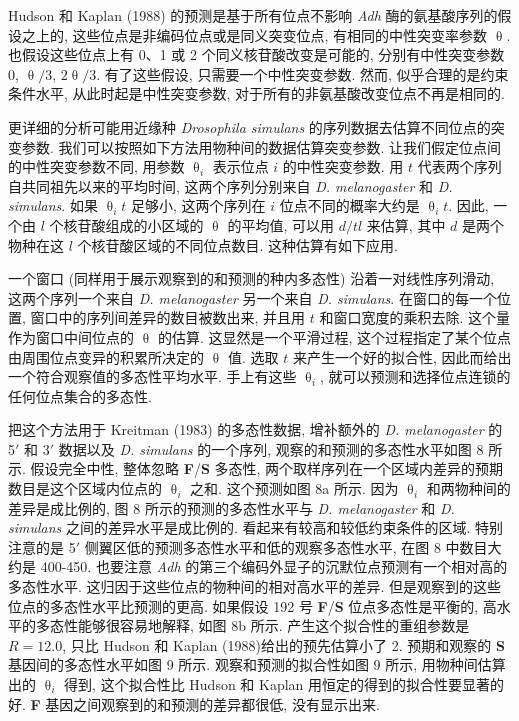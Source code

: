 \documentclass[12pt]{article}
\begin{document}
Hudson 和 Kaplan (1988) 的预测是基于所有位点不影响 \textit{Adh} 酶的氨基酸序列的假设之上的,
这些位点是非编码位点或是同义突变位点, 有相同的中性突变率参数 $\uptheta$. 也假设这些位点上有 0、1 或 2
个同义核苷酸改变是可能的, 分别有中性突变参数 0, $\uptheta /3$, $2 \uptheta /3$. 有了这些假设, 只需要一个中性突变参数. 然而,
似乎合理的是约束条件水平, 从此时起是中性突变参数, 对于所有的非氨基酸改变位点不再是相同的.

更详细的分析可能用近缘种 \textit{Drosophila simulans} 的序列数据去估算不同位点的突变参数.
我们可以按照如下方法用物种间的数据估算突变参数. 让我们假定位点间的中性突变参数不同, 用参数 $\uptheta_{i}$ 表示位点 $i$
的中性突变参数. 用 $t$ 代表两个序列自共同祖先以来的平均时间, 这两个序列分别来自 \textit{D. melanogaster} 和
\textit{D. simulans}. 如果 $\uptheta_{i}t$ 足够小, 这两个序列在 $i$ 位点不同的概率大约是 $\uptheta_{i}t$. 因此,
一个由 $l$ 个核苷酸组成的小区域的 $\uptheta$ 的平均值, 可以用 $d/tl$ 来估算, 其中 $d$ 是两个物种在这 $l$
个核苷酸区域的不同位点数目. 这种估算有如下应用.

一个窗口 (同样用于展示观察到的和预测的种内多态性) 沿着一对线性序列滑动, 这两个序列一个来自 \textit{D.
    melanogaster} 另一个来自 \textit{D. simulans}. 在窗口的每一个位置, 窗口中的序列间差异的数目被数出来, 并且用 $t$
和窗口宽度的乘积去除. 这个量作为窗口中间位点的 $\uptheta$ 的估算. 这显然是一个平滑过程,
这个过程指定了某个位点由周围位点变异的积累所决定的 $\uptheta$ 值. 选取 $t$ 来产生一个好的拟合性,
因此而给出一个符合观察值的多态性平均水平. 手上有这些 $\uptheta_{i}$, 就可以预测和选择位点连锁的任何位点集合的多态性.

把这个方法用于 Kreitman (1983) 的多态性数据, 增补额外的 \textit{D. melanogaster} 的 5${\prime}$ 和
3${\prime}$ 数据以及 \textit{D. simulans} 的一个序列, 观察的和预测的多态性水平如图 8 所示. 假设完全中性,
整体忽略 \textbf{F}/\textbf{S} 多态性, 两个取样序列在一个区域内差异的预期数目是这个区域内位点的 $\uptheta _{i}$ 之和.
这个预测如图 8a 所示. 因为 $\uptheta _{i}$ 和两物种间的差异是成比例的, 图 8 所示的预测的多态性水平与 \textit{D.
    melanogaster} 和 \textit{D. simulans} 之间的差异水平是成比例的. 看起来有较高和较低约束条件的区域. 特别注意的是
5${\prime}$ 侧翼区低的预测多态性水平和低的观察多态性水平, 在图 8 中数目大约是 400-450.
也要注意 \textit{Adh} 的第三个编码外显子的沉默位点预测有一个相对高的多态性水平. 这归因于这些位点的物种间的相对高水平的差异.
但是观察到的这些位点的多态性水平比预测的更高. 如果假设 192 号 \textbf{F}/\textbf{S} 位点多态性是平衡的,
高水平的多态性能够很容易地解释, 如图 8b 所示. 产生这个拟合性的重组参数是 $R=12.0$, 只比 Hudson 和
Kaplan (1988)给出的预先估算小了 2. 预期和观察的 \textbf{S} 基因间的多态性水平如图 9 所示. 观察和预测的拟合性如图 9
所示, 用物种间估算出的 $\uptheta _{i}$ 得到, 这个拟合性比 Hudson 和 Kaplan 用恒定的得到的拟合性要显著的好.
\textbf{F} 基因之间观察到的和预测的差异都很低, 没有显示出来.
\end{document}
